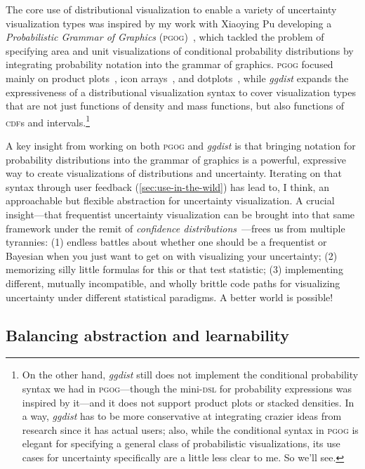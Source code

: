 \documentclass[journal]{vgtc}                     %
\begin{document}
The core use of distributional visualization to enable a variety of uncertainty visualization types was inspired by my work with Xiaoying Pu developing a \textit{Probabilistic Grammar of Graphics} (\textsc{pgog})~\cite{pu2020probabilistic}, which tackled the problem of specifying area and unit visualizations of conditional probability distributions by integrating probability notation into the grammar of graphics. \textsc{pgog} focused mainly on product plots~\cite{wickham2011product}, icon arrays~\cite{ancker2006design}, and dotplots~\cite{wilkinson1999dot}, while \textit{ggdist} expands the expressiveness of a distributional visualization syntax to cover visualization types that are not just functions of density and mass functions, but also functions of \textsc{cdf}s and intervals.\footnote{On the other hand, \textit{ggdist} still does not implement the conditional probability syntax we had in \textsc{pgog}---though the mini-\textsc{dsl} for probability expressions was inspired by it---and it does not support product plots or stacked densities. In a way, \textit{ggdist} has to be more conservative at integrating crazier ideas from research since it has actual users; also, while the conditional syntax in \textsc{pgog} is elegant for specifying a general class of probabilistic visualizations, its use cases for uncertainty specifically are a little less clear to me. So we'll see.} 

A key insight from working on both \textsc{pgog} and \textit{ggdist} is that bringing notation for probability distributions into the grammar of graphics is a powerful, expressive way to create visualizations of distributions and uncertainty. Iterating on that syntax through user feedback 
(\cref{sec:use-in-the-wild}) has lead to, I think, an approachable but flexible abstraction for uncertainty visualization. A crucial insight---that frequentist uncertainty visualization can be brought into that same framework under the remit of \textit{confidence distributions}~\cite{xie2013confidence}---frees us from multiple tyrannies: (1) endless battles about whether one should be a frequentist or Bayesian when you just want to get on with visualizing your uncertainty; (2) memorizing silly little formulas
for this or that test statistic; (3) implementing different, mutually incompatible, and wholly brittle code paths for visualizing uncertainty under different statistical paradigms. A better world is possible!

\subsection{Balancing abstraction and learnability}
\end{document}

